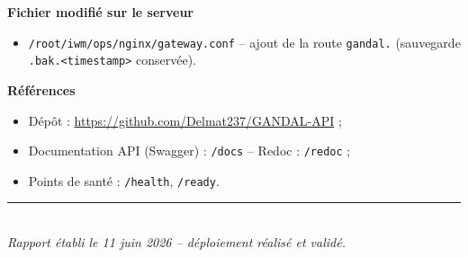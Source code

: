 \documentclass[11pt,a4paper]{article}
\newcommand{\code}[1]{\texttt{\small #1}}
\begin{document}
\noindent\textbf{Fichier modifié sur le serveur}
\begin{itemize}
  \item \code{/root/iwm/ops/nginx/gateway.conf} -- ajout de la route \code{gandal.}
        (sauvegarde \code{.bak.<timestamp>} conservée).
\end{itemize}

\noindent\textbf{Références}
\begin{itemize}
  \item Dépôt : \url{https://github.com/Delmat237/GANDAL-API} ;
  \item Documentation API (Swagger) : \code{/docs} -- Redoc : \code{/redoc} ;
  \item Points de santé : \code{/health}, \code{/ready}.
\end{itemize}

\vspace{1.5cm}
\begin{center}
{\color{rule}\rule{0.5\linewidth}{0.6pt}}\\[0.3cm]
\textit{Rapport établi le 11 juin 2026 -- déploiement réalisé et validé.}
\end{center}
\end{document}
